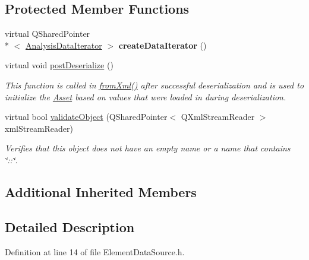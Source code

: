 \subsection*{Protected Member Functions}
\begin{DoxyCompactItemize}
\item 
\hypertarget{class_picto_1_1_element_data_source_af7c8ac1b82da80ebd7648a7ee333ff5f}{virtual Q\-Shared\-Pointer\\*
$<$ \hyperlink{class_picto_1_1_analysis_data_iterator}{Analysis\-Data\-Iterator} $>$ {\bfseries create\-Data\-Iterator} ()}\label{class_picto_1_1_element_data_source_af7c8ac1b82da80ebd7648a7ee333ff5f}

\item 
virtual void \hyperlink{class_picto_1_1_element_data_source_a8a7867cdc6d572fd167ac0b554935d41}{post\-Deserialize} ()
\begin{DoxyCompactList}\small\item\em This function is called in \hyperlink{class_picto_1_1_asset_a8bed4da09ecb1c07ce0dab313a9aba67}{from\-Xml()} after successful deserialization and is used to initialize the \hyperlink{class_picto_1_1_asset}{Asset} based on values that were loaded in during deserialization. \end{DoxyCompactList}\item 
\hypertarget{class_picto_1_1_element_data_source_af49f3d4cc7142358d9593bc18ca2d34d}{virtual bool \hyperlink{class_picto_1_1_element_data_source_af49f3d4cc7142358d9593bc18ca2d34d}{validate\-Object} (Q\-Shared\-Pointer$<$ Q\-Xml\-Stream\-Reader $>$ xml\-Stream\-Reader)}\label{class_picto_1_1_element_data_source_af49f3d4cc7142358d9593bc18ca2d34d}

\begin{DoxyCompactList}\small\item\em Verifies that this object does not have an empty name or a name that contains \char`\"{}\-::\char`\"{}. \end{DoxyCompactList}\end{DoxyCompactItemize}
\subsection*{Additional Inherited Members}


\subsection{Detailed Description}


Definition at line 14 of file Element\-Data\-Source.\-h.



